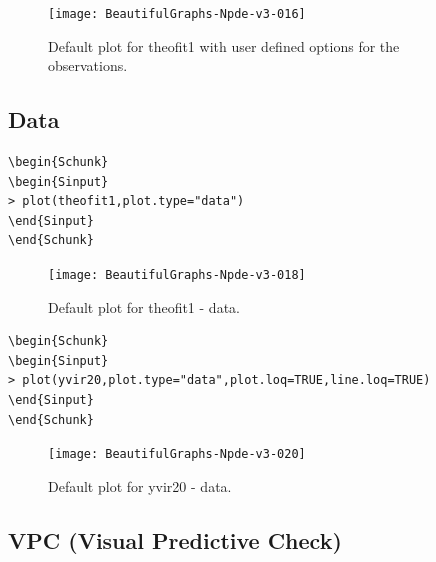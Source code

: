 \documentclass{report}
\begin{document}
\begin{figure}[H]
\caption{Default plot for theofit1 with user defined options for the observations.}
\label{fig:plotByDefault}
\centering
\texttt{[image: BeautifulGraphs-Npde-v3-016]}
\end{figure}

\subsection{Data}

\begin{lstlisting}[linerange=\\begin\{Sinput\}-\\end\{Sinput\}, includerangemarker=false]
\begin{Schunk}
\begin{Sinput}
> plot(theofit1,plot.type="data")
\end{Sinput}
\end{Schunk}
\end{lstlisting}

\begin{figure}[H]
\caption{Default plot for theofit1 - data.}
\label{fig:plotByDefault}
\centering
\texttt{[image: BeautifulGraphs-Npde-v3-018]}
\end{figure}

\begin{lstlisting}[linerange=\\begin\{Sinput\}-\\end\{Sinput\}, includerangemarker=false]
\begin{Schunk}
\begin{Sinput}
> plot(yvir20,plot.type="data",plot.loq=TRUE,line.loq=TRUE)
\end{Sinput}
\end{Schunk}
\end{lstlisting}

\begin{figure}[H]
\caption{Default plot for yvir20 - data.}
\centering
\texttt{[image: BeautifulGraphs-Npde-v3-020]}
\end{figure}

\subsection{VPC (Visual Predictive Check)}
\end{document}
